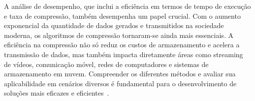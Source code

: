A análise de desempenho, que inclui a eficiência em termos de tempo de execução e taxa de compressão, também desempenha um papel crucial. Com o aumento exponencial da quantidade de dados gerados e transmitidos na sociedade moderna, os algoritmos de compressão tornaram-se ainda mais essenciais. A eficiência na compressão não só reduz os custos de armazenamento e acelera a transmissão de dados, mas também impacta diretamente áreas como streaming de vídeos, comunicação móvel, redes de computadores e sistemas de armazenamento em nuvem. Compreender os diferentes métodos e avaliar sua aplicabilidade em cenários diversos é fundamental para o desenvolvimento de soluções mais eficazes e eficientes~\cite{salomon2007data}.

